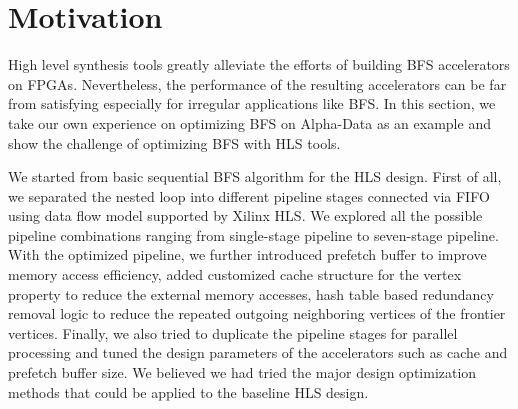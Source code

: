 \section{Motivation} \label{sec:motivation}
High level synthesis tools greatly alleviate the efforts of building BFS accelerators on FPGAs. 
Nevertheless, the performance of the resulting accelerators can be far from satisfying 
especially for irregular applications like BFS. In this section, we take our own experience 
on optimizing BFS on Alpha-Data as an example and show the challenge of 
optimizing BFS with HLS tools.

We started from basic sequential BFS algorithm for 
the HLS design. First of all, we separated the nested loop into different pipeline 
stages connected via FIFO using data flow model supported by Xilinx HLS. 
We explored all the possible pipeline combinations ranging from single-stage 
pipeline to seven-stage pipeline. With the optimized pipeline, we further 
introduced prefetch buffer to improve memory access efficiency, 
added customized cache structure for the vertex property to reduce the external 
memory accesses, hash table based redundancy removal logic to reduce the repeated 
outgoing neighboring vertices of the frontier vertices. Finally, we also tried to 
duplicate the pipeline stages for parallel processing and tuned the design parameters 
of the accelerators such as cache and prefetch buffer size. We believed 
we had tried the major design optimization methods that could be applied to the 
baseline HLS design. 

%
%
%

